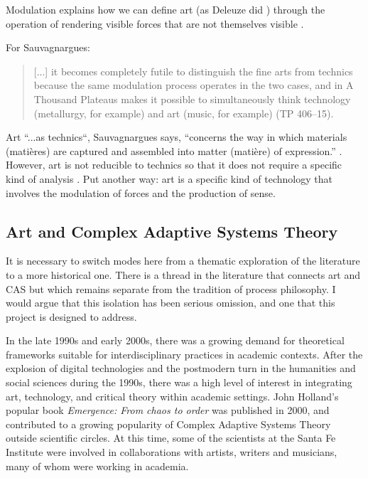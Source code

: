         Modulation explains how we can define art (as Deleuze did \citep[p.48]{DeleuzeFrncsBcn2003} \citep[p.73]{DeleuzeDifferenceAndRepetition1994}) through the operation of rendering visible forces that are not themselves visible \citep[p.73]{SauvagnarguesArtmchns2016}.

        For Sauvagnargues:

        \begin{quote}
            [...] it becomes completely futile to distinguish the fine arts from technics because the same modulation process operates in the two cases, and in A Thousand Plateaus makes it possible to simultaneously think technology (metallurgy, for example) and art (music, for example) (TP 406–15). \citep[p.73]{SauvagnarguesArtmchns2016}
        \end{quote}

        Art “...as technics“, Sauvagnargues says, “concerns the way in which materials (matières) are captured and assembled into matter (matière) of expression.” \citep[p.75]{SauvagnarguesArtmchns2016}. However, art is not reducible to technics so that it does not require a specific kind of analysis \citep[p.74]{SauvagnarguesArtmchns2016}. Put another way: art is a specific kind of technology that involves the modulation of forces and the production of sense.

    \subsection{Art and Complex Adaptive Systems Theory}\label{sec:ArtAndCAS}

        It is necessary to switch modes here from a thematic exploration of the literature to a more historical one. There is a thread in the literature that connects art and CAS but which remains separate from the tradition of process philosophy. I would argue that this isolation has been serious omission, and one that this project is designed to address.

        In the late 1990s and early 2000s, there was a growing demand for theoretical frameworks suitable for interdisciplinary practices in academic contexts. After the explosion of digital technologies and the postmodern turn in the humanities and social sciences during the 1990s, there was a high level of interest in integrating art, technology, and critical theory within academic settings. John Holland's popular book \emph{Emergence: From chaos to order} was published in 2000, and contributed to a growing popularity of Complex Adaptive Systems Theory outside scientific circles. At this time, some of the scientists at the Santa Fe Institute were involved in collaborations with artists, writers and musicians, many of whom were working in academia.
        
